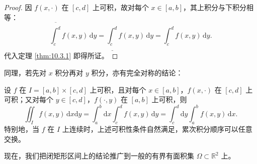 \begin{proof}
因 $f(x, \cdot)$ 在 $[c, d]$ 上可积，故对每个 $x \in [a, b]$，其上积分与下积分相等：
\[
\overline{\int_c^d} f(x, y)\,\mathrm{d}y = \underline{\int_c^d} f(x, y)\,\mathrm{d}y = \int_c^d f(x, y)\,\mathrm{d}y.
\]
代入定理 \ref{thm:10.3.1} 即得所证。
\end{proof}

同理，若先对 $x$ 积分再对 $y$ 积分，亦有完全对称的结论：

\begin{theorem}[闭区间上化二重积分为累次积分]\label{thm:10.3.3}
设 $f$ 在 $I = [a, b] \times [c, d]$ 上可积，且对每个 $x \in [a, b]$，$f(x, \cdot)$ 在 $[c, d]$ 上可积；又对每个 $y \in [c, d]$，$f(\cdot, y)$ 在 $[a, b]$ 上可积，则
\[
\iint_I f(x, y)\,\mathrm{d}x\mathrm{d}y = \int_a^b \mathrm{d}x \int_c^d f(x, y)\,\mathrm{d}y = \int_c^d \mathrm{d}y \int_a^b f(x, y)\,\mathrm{d}x.
\]
特别地，当 $f$ 在 $I$ 上连续时，上述可积性条件自然满足，累次积分顺序可以任意交换。
\end{theorem}

现在，我们把闭矩形区间上的结论推广到一般的有界有面积集 $\Omega \subset \mathbb{R}^2$ 上。


